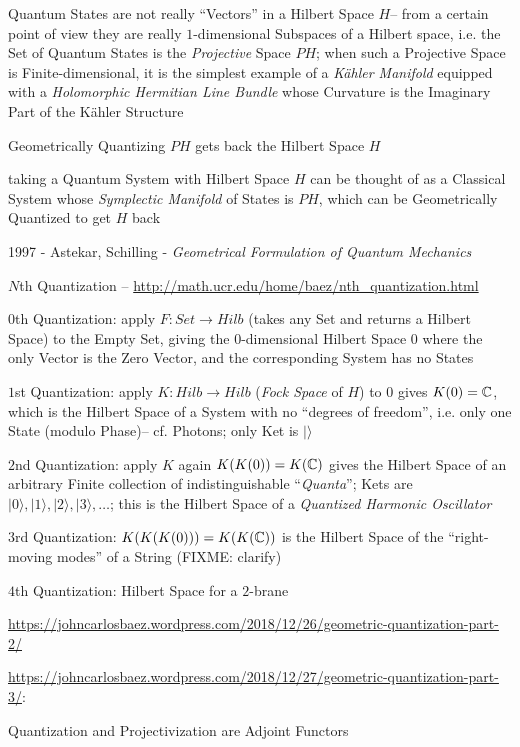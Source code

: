 Quantum States are not really ``Vectors'' in a Hilbert Space $H$-- from a
certain point of view they are really $1$-dimensional Subspaces of a Hilbert
space, i.e. the Set of Quantum States is the \emph{Projective} Space $P H$; when
such a Projective Space is Finite-dimensional, it is the simplest example of a
\emph{K\"ahler Manifold} equipped with a \emph{Holomorphic Hermitian Line
  Bundle} whose Curvature is the Imaginary Part of the K\"ahler Structure

Geometrically Quantizing $PH$ gets back the Hilbert Space $H$

taking a Quantum System with Hilbert Space $H$ can be thought of as a Classical
System whose \emph{Symplectic Manifold} of States is $P H$, which can be
Geometrically Quantized to get $H$ back

1997 - Astekar, Schilling - \emph{Geometrical Formulation of Quantum Mechanics}

$N$th Quantization -- \url{http://math.ucr.edu/home/baez/nth_quantization.html}

$0$th Quantization: apply $F : Set \rightarrow Hilb$ (takes any Set and returns
a Hilbert Space) to the Empty Set, giving the $0$-dimensional Hilbert Space
$\xspace{0}$ where the only Vector is the Zero Vector, and the corresponding
System has no States

$1$st Quantization: apply $K : Hilb \rightarrow Hilb$ (\emph{Fock Space} of $H$)
to $\xspace{0}$ gives $K({0}) = \mathbb{C}$, which is the Hilbert Space of a
System with no ``degrees of freedom'', i.e. only one State (modulo Phase)-- cf.
Photons; only Ket is $|\rangle$

$2$nd Quantization: apply $K$ again $K(K({0})) = K(\mathbb{C})$ gives the
Hilbert Space of an arbitrary Finite collection of indistinguishable
``\emph{Quanta}''; Kets are $|0\rangle, |1\rangle, |2\rangle, |3\rangle,
\ldots$; this is the Hilbert Space of a \emph{Quantized Harmonic Oscillator}

$3$rd Quantization: $K(K(K({0}))) = K(K(\mathbb{C}))$ is the Hilbert Space of
the ``right-moving modes'' of a String (FIXME: clarify)

$4$th Quantization: Hilbert Space for a $2$-brane

\url{https://johncarlosbaez.wordpress.com/2018/12/26/geometric-quantization-part-2/}

\url{https://johncarlosbaez.wordpress.com/2018/12/27/geometric-quantization-part-3/}:

Quantization and Projectivization are Adjoint Functors




